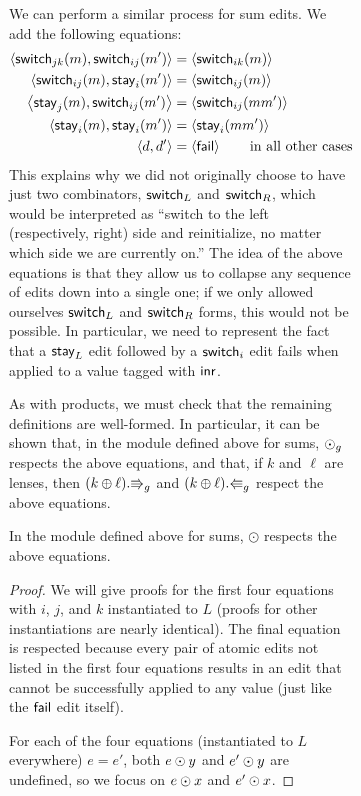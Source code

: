 \begin{figure}
\begin{figure}
We can perform a similar process for sum edits. We add the following
equations:
\begin{align*}
    \left<\mathsf{switch}_{jk}(m),\mathsf{switch}_{ij}(m')\right>
        &= \left<\mathsf{switch}_{ik}(m)\right> \\
    \left<\mathsf{switch}_{ij}(m),\mathsf{stay}_i(m')\right>
        &= \left<\mathsf{switch}_{ij}(m)\right> \\
    \left<\mathsf{stay}_j(m),\mathsf{switch}_{ij}(m')\right>
        &= \left<\mathsf{switch}_{ij}(mm')\right> \\
    \left<\mathsf{stay}_i(m),\mathsf{stay}_i(m')\right>
        &= \left<\mathsf{stay}_i(mm')\right> \\
    \left< d, d'\right>
        &= \left<\mathsf{fail}\right> \qquad \mbox{in all other cases}
\end{align*}
This explains why we did not originally choose to have just two combinators,
$\mathsf{switch}_L$ and $\mathsf{switch}_R$, which would be interpreted as ``switch to
the left (respectively, right) side and reinitialize, no matter which side
we are currently on.'' The idea of the above equations is that they allow
us to collapse any sequence of edits down into a single one; if we only
allowed ourselves $\mathsf{switch}_L$ and $\mathsf{switch}_R$ forms, this would not be
possible. In particular, we need to represent the fact that a $\mathsf{stay}_L$
edit followed by a $\mathsf{switch}_i$ edit fails when applied to a value tagged
with $\mathsf{inr}$.

As with products, we must check that the remaining
definitions are well-formed.  \iffull\else In particular, it can be shown that,
in the module defined above for sums, $\odot_g$ respects the above
equations, and that, if $k$ and $\ell$ are lenses, then
$(k\oplus\ell).\mathord{\Rrightarrow}_g$ and $(k\oplus\ell).\mathord{\Lleftarrow}_g$ respect the above
equations.  \fi

\iffull
\begin{lemma}
    In the module defined above for sums, $\odot$ respects the above
    equations.
\end{lemma}
\begin{proof}
    We will give proofs for the first four equations with $i$, $j$, and $k$
    instantiated to $L$ (proofs for other instantiations are nearly
    identical). The final equation is respected because every pair of atomic
    edits not listed in the first four equations results in an edit that
    cannot be successfully applied to any value (just like the $\mathsf{fail}$ edit
    itself).

    For each of the four equations (instantiated to $L$ everywhere) $e=e'$,
    both $e\odot y$ and $e'\odot y$ are undefined, so we focus
    on $e\odot x$ and $e'\odot x$.


\end{proof}
\end{figure}
\end{figure}
